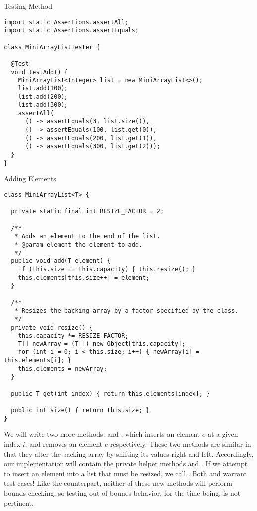 \begin{cl}[]{Testing   Method}
\begin{lstlisting}[language=MyJava]
import static Assertions.assertAll;
import static Assertions.assertEquals;

class MiniArrayListTester {

  @Test
  void testAdd() {
    MiniArrayList<Integer> list = new MiniArrayList<>();
    list.add(100);
    list.add(200);
    list.add(300);
    assertAll(
      () -> assertEquals(3, list.size()),
      () -> assertEquals(100, list.get(0)),
      () -> assertEquals(200, list.get(1)),
      () -> assertEquals(300, list.get(2)));
  }
}
\end{lstlisting}
\end{cl}

\begin{cl}[]{ Adding Elements}
\begin{lstlisting}[language=MyJava]
class MiniArrayList<T> {

  private static final int RESIZE_FACTOR = 2;

  /**
   * Adds an element to the end of the list.
   * @param element the element to add.
   */
  public void add(T element) {
    if (this.size == this.capacity) { this.resize(); }
    this.elements[this.size++] = element;
  }

  /**
   * Resizes the backing array by a factor specified by the class.
   */
  private void resize() {
    this.capacity *= RESIZE_FACTOR;
    T[] newArray = (T[]) new Object[this.capacity];
    for (int i = 0; i < this.size; i++) { newArray[i] = this.elements[i]; }
    this.elements = newArray;
  }

  public T get(int index) { return this.elements[index]; }

  public int size() { return this.size; }
}
\end{lstlisting}
\end{cl}

We will write two more methods:  and , which inserts an element $e$ at a given index $i$, and removes an element $e$ respectively. These two methods are similar in that they alter the backing array by shifting its values right and left. Accordingly, our implementation will contain the private helper methods  and . If we attempt to insert an element into a list that must be resized, we call . Both  and  warrant test cases! Like the  counterpart, neither of these new methods will perform bounds checking, so testing out-of-bounds behavior, for the time being, is not pertinent.

